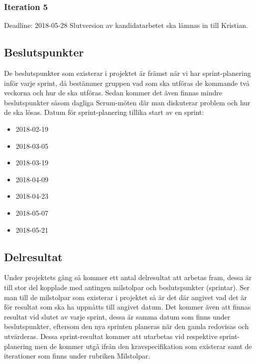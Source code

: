 \documentclass[a4paper,10pt]{article}
\begin{document}
\subsubsection{Iteration 5}
Deadline: 2018-05-28
Slutversion av kandidatarbetet ska lämnas in till Kristian.
\subsection{Beslutspunkter}
De beslutspunkter som existerar i projektet är främst när vi har sprint-planering inför varje sprint, då bestämmer gruppen vad som ska utföras de kommande två veckorna och hur de ska utföras. Sedan kommer det även finnas mindre beslutspunkter såsom dagliga Scrum-möten där man diskuterar problem och hur de ska lösas.
Datum för sprint-planering tillika start av en sprint:
\begin{itemize}
\item 2018-02-19
\item 2018-03-05
\item 2018-03-19
\item 2018-04-09
\item 2018-04-23
\item 2018-05-07
\item 2018-05-21
\end{itemize}
\subsection{Delresultat}
Under projektets gång så kommer ett antal delresultat att arbetas fram, dessa är till stor del kopplade med antingen milstolpar och beslutspunkter (sprintar). Ser man till de milstolpar som existerar i projektet så är det där angivet vad det är för resultat som ska ha uppnåtts till angivet datum. Det kommer även att finnas resultat vid slutet av varje sprint, dessa är samma datum som finns under beslutspunkter, eftersom den nya sprinten planeras när den gamla redovisas och utvärderas. Dessa sprint-resultat kommer att utarbetas vid respektive sprint-planering men de kommer utgå ifrån den kravspecifikation som existerar samt de iterationer som finns under rubriken Milstolpar.
\end{document}
